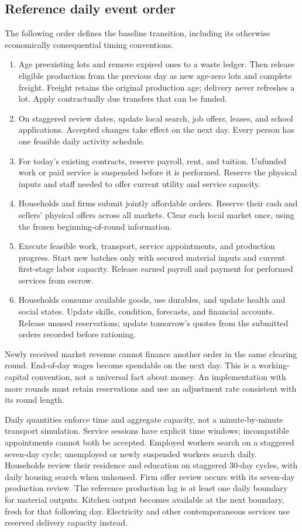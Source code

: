 \documentclass[10pt,a4paper,twocolumn]{article}
\begin{document}
\subsection{Reference daily event order}
The following order defines the baseline transition, including its
otherwise economically consequential timing conventions.
\begin{enumerate}
\item Age preexisting lots and remove expired ones to a waste ledger.
Then release eligible production from the previous day as new age-zero
lots and complete freight. Freight retains the original production age;
delivery never refreshes a lot. Apply
contractually due transfers that can be funded.
\item On staggered review dates, update local search, job offers, leases,
and school applications. Accepted changes take effect on the next day.
Every person has one feasible daily activity schedule.
\item For today's existing contracts, reserve payroll, rent, and tuition.
Unfunded work or paid service is suspended before it is performed.
Reserve the physical inputs and staff needed to offer current utility
and service capacity.
\item Households and firms submit jointly affordable orders. Reserve
their cash and sellers' physical offers across all markets. Clear each
local market once, using the frozen beginning-of-round information.
\item Execute feasible work, transport, service appointments, and
production progress. Start new batches only with secured material
inputs and current first-stage labor capacity. Release earned payroll
and payment for performed services from escrow.
\item Households consume available goods, use durables, and update
health and social states. Update skills, condition, forecasts, and
financial accounts. Release unused reservations; update tomorrow's
quotes from the submitted orders recorded before rationing.
\end{enumerate}
Newly received market revenue cannot finance another order in the same
clearing round. End-of-day wages become spendable on the next day. This
is a working-capital convention, not a universal fact about money.
An implementation with more rounds must retain reservations and use an
adjustment rate consistent with its round length.

Daily quantities enforce time and aggregate capacity, not a
minute-by-minute transport simulation. Service sessions have explicit
time windows; incompatible appointments cannot both be accepted.
Employed workers search on a staggered seven-day cycle; unemployed or
newly suspended workers search daily. Households review their residence
and education on staggered 30-day cycles, with daily housing search when
unhoused. Firm offer review occurs with its seven-day production review.
The reference production lag is at least one daily boundary for material
outputs. Kitchen output becomes
available at the next boundary, fresh for that following day. Electricity
and other contemporaneous services use reserved delivery capacity instead.
\end{document}
